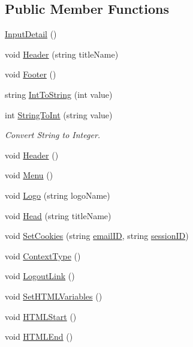 \subsection*{Public Member Functions}
\begin{DoxyCompactItemize}
\item 
\hyperlink{classInputDetail_ab53655b14d922eb32b5d5d06c702e497}{Input\-Detail} ()
\item 
void \hyperlink{classInputDetail_ae55dcc0e15b85d302a09046b145330bb}{Header} (string title\-Name)
\item 
void \hyperlink{classInputDetail_acbc05b1bc6a371cf0a52222cc95e467d}{Footer} ()
\item 
string \hyperlink{classInputDetail_ad0a78d7c864bcccf7813a526d59573be}{Int\-To\-String} (int value)
\item 
int \hyperlink{classInputDetail_aaf532dd61f0aee82b116fef2da8e821f}{String\-To\-Int} (string value)
\begin{DoxyCompactList}\small\item\em Convert String to Integer. \end{DoxyCompactList}\item 
void \hyperlink{classPageLayout_a7726061f0653245f644a05807fa92472}{Header} ()
\item 
void \hyperlink{classPageLayout_a49af1dca286bbee9432192a7b3c00332}{Menu} ()
\item 
void \hyperlink{classPageLayout_ae60235c6af48e3ebbc6343d02456da0c}{Logo} (string logo\-Name)
\item 
void \hyperlink{classPageLayout_ae50907d56f0ba7a85f7ccfdeafa45bcc}{Head} (string title\-Name)
\item 
void \hyperlink{classPageLayout_a449b4dde24cf3dc10299dc3c7bfc0e9c}{Set\-Cookies} (string \hyperlink{classInputDetail_ad3f1db4fddbe0d4efbf1d5bc74d52257}{email\-I\-D}, string \hyperlink{classPageLayout_ab796c4a12a3f9c089881085e508e2a1c}{session\-I\-D})
\item 
void \hyperlink{classPageLayout_a9884173383d3e9b91e5b4ba6a619caa9}{Context\-Type} ()
\item 
void \hyperlink{classPageLayout_abe2cfa43480c1b48125b3d618cab7831}{Logout\-Link} ()
\item 
void \hyperlink{classPageStructureMaker_aaf78d67380c400cc0057c6519276f721}{Set\-H\-T\-M\-L\-Variables} ()
\item 
void \hyperlink{classPageStructureMaker_ad25d6abc983253567e2370882fc1b407}{H\-T\-M\-L\-Start} ()
\item 
void \hyperlink{classPageStructureMaker_a63b877af1c2c8de8332e3f7eb4c2c2b0}{H\-T\-M\-L\-End} ()

\end{DoxyCompactItemize}
